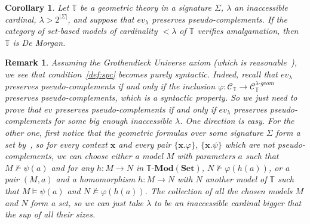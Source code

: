 \documentclass{article}
\newtheorem{corollary}[theorem]{Corollary}
\newtheorem{remark}[theorem]{Remark}
\newcommand{\T}{\mathbb{T}}
\renewcommand{\phi}{\varphi}
\newcommand{\Set}{\mathbf{Set}}
\newcommand{\Mod}{{\mathbf{Mod}}}
\begin{document}
\begin{corollary}
    Let $\T$ be a geometric theory in a signature $\Sigma$, $\lambda$ an inaccessible cardinal, $\lambda>2^{|\Sigma|}$, and suppose that $ev_\lambda$ preserves pseudo-complements. If the category of set-based models of cardinality $<\lambda$ of $\T$ verifies amalgamation, then $\T$ is De Morgan.
\end{corollary}

\begin{remark}\label{rem:gu}
    Assuming the Grothendieck Universe axiom (which is reasonable~\cite{maddy1988believing}), we see that condition~\ref{def:spc} becomes purely syntactic. Indeed, recall that $ev_\lambda$ preserves pseudo-complements if and only if the inclusion $\phi:\mathcal{C}_\T\to \mathcal{C}_\T^{\lambda\text{-}geom}$ preserves pseudo-complements, which is a syntactic property. So we just need to prove that $ev$ preserves pseudo-complements if and only if $ev_\lambda$ preserves pseudo-complements for some big enough inaccessible $\lambda$. One direction is easy. For the other one, first notice that the geometric formulas over some signature $\Sigma$ form a set by~\cite[Lemma D1.3.8]{johnstone2002sketches}, so for every context $\mathbf{x}$ and every pair $\{\mathbf{x}.\phi\}$, $\{\mathbf{x}.\psi\}$ which are not pseudo-complements, we can choose either a model $M$ with parameters $a$ such that $M\not\models\psi(a)$ and for any $h:M\xrightarrow{} N$ in $\T\text{-}\Mod(\Set)$, $N\not\models\phi(h(a))$, or a pair $(M,a)$ and a homomorphism $h:M\to N$ with $N$ another model of $\T$ such that $M\models\psi(a)$ and $N\not\models\phi(h(a))$. The collection of all the chosen models $M$ and $N$ form a set, so we can just take $\lambda$ to be an inaccessible cardinal bigger that the sup of all their sizes. 
\end{remark}
\end{document}
